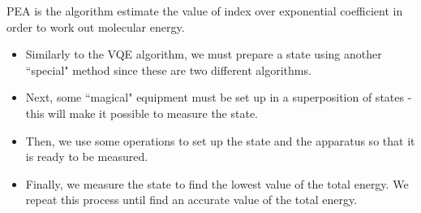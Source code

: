 \documentclass[14pt,landscape,color=UCLdarkred,margin=3cm]{uclposter}
\begin{document}
\begin{multicols}{3}
PEA is the algorithm estimate the value of index over exponential coefficient in order to work out molecular energy.

\begin{highlightbox}
\begin{itemize}
\item Similarly to the VQE algorithm, we must prepare a state using another ``special" method since these are two different algorithms. 
\item Next, some ``magical" equipment must be set up in a superposition of states - this will make it possible to measure the state.
\item Then, we use some operations to set up the state and the apparatus so that it is ready to be measured. 
\item Finally, we measure the state to find the lowest value of the total energy. We repeat this process until find an accurate value of the total energy.
\end{itemize}
\end{highlightbox}




\end{multicols}
\end{document}
